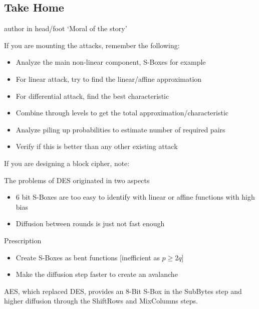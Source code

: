 \documentclass[9pt]{beamer}
\begin{document}
\subsection{Take Home}
\begin{frame}
\begin{beamercolorbox}[ht=2.5ex,dp=1.125ex,center,rounded=true,shadow=true]{author in head/foot}
`Moral of the story'
\end{beamercolorbox}
\end{frame}

\begin{frame}
If you are mounting the attacks, remember the following:

\vspace{5mm}
\pause
\begin{itemize}[<+->]
\item{Analyze the main non-linear component, S-Boxes for example}
\item{For linear attack, try to find the linear/affine approximation}
\item{For differential attack, find the best characteristic}
\item{Combine through levels to get the total approximation/characteristic}
\item{Analyze piling up probabilities to estimate number of required pairs}
\item{Verify if this is better than any other existing attack}
\end{itemize}

\end{frame}

\begin{frame}
If you are designing a block cipher, note:

\vspace{5mm}
\pause The problems of DES originated in two aspects
\begin{itemize}[<+->]
\item{6 bit S-Boxes are too easy to identify with linear or affine functions with high bias}
\item{Diffusion between rounds is just not fast enough}
\end{itemize}

\vspace{2mm}
\pause Prescription
\begin{itemize}[<+->]
\item{Create S-Boxes as bent functions [inefficient as $p \geq 2q$]}
\item{Make the diffusion step faster to create an avalanche}
\end{itemize}

\vspace{3mm}
\pause AES, which replaced DES, provides an 8-Bit S-Box in the SubBytes step and higher diffusion through the ShiftRows and MixColumns steps. 
\end{frame}
\end{document}
